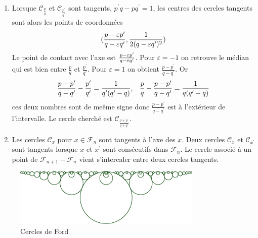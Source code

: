 \begin{enumerate}
\item  Lorsque $\mathcal{C}_{\frac{p}{q}}$ et $\mathcal{C}_{\frac{p^{\prime }%
}{q^{\prime }}}$ sont tangents, $p^{\prime }q-pq^{\prime }=1$, les centres
des cercles tangents sont alors les points de coordonn{\'e}es
\[
(\frac{p-\varepsilon p^{\prime }}{q-\varepsilon q^{\prime }},\frac{1}{%
2(q-\varepsilon q^{\prime })^{2}})
\]
Le point de contact avec l'axe est $\frac{p-\varepsilon p^{\prime }}{%
q-\varepsilon q^{\prime }}$.\newline
Pour $\varepsilon =-1$ on retrouve le m{\'e}dian qui est bien entre $\frac{p}{q}$ et $\frac{p^{\prime }}{q^{\prime }}$. Pour $\varepsilon =1$ on obtient $\frac{p-p^{\prime }}{q-q^{\prime }}$. Or
\[
\frac{p-p^{\prime }}{q-q^{\prime }}-\frac{p^{\prime }}{q^{\prime }}=\frac{1}{q^{\prime }(q^{\prime }-q)}\text{,\quad }\frac{p}{q}-\frac{p-p^{\prime }}{q-q^{\prime }}=\frac{1}{q(q^{\prime }-q)}
\]
ces deux nombres sont de me{\^e}me signe donc $\frac{p-p^{\prime }}{q-q^{\prime }}$ est {\`a} l'ext{\'e}rieur de l'intervalle. Le cercle cherch{\'e} est $\mathcal{C}_{\frac{p+p^{\prime }}{q+q^{\prime }}}$.

\item  Les cercles $\mathcal{C}_{x}$ pour $x\in \mathcal{F}_{n}$ sont tangents {\`a} l'axe des $x.$ Deux cercles $\mathcal{C}_{x}$ et $\mathcal{C}_{x^{\prime }}$ sont tangents lorsque $x$ et $x^{\prime }$ sont cons{\'e}cutifs dans $\mathcal{F}_{n}$. Le cercle associ{\'e} {\`a} un point de $\mathcal{F}_{n+1}-\mathcal{F}_{n}$ vient s'intercaler entre deux cercles tangents.
\end{enumerate}

\begin{figure}
 \centering
 \includegraphics[width=9cm]{Cfarey_1.pdf}
 \caption{Cercles de Ford}
\end{figure}

